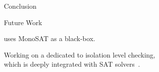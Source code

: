 
\begin{frame}{Conclusion}
  \begin{center}
  \end{center}
\end{frame}

\begin{frame}{Future Work}
  \begin{center}
    \polysi{} uses MonoSAT as a black-box.

    \vspace{0.80cm}
    Working on a  dedicated to
    isolation level checking, \\[5pt]
    which is deeply integrated with SAT solvers~.
  \end{center}
\end{frame}
